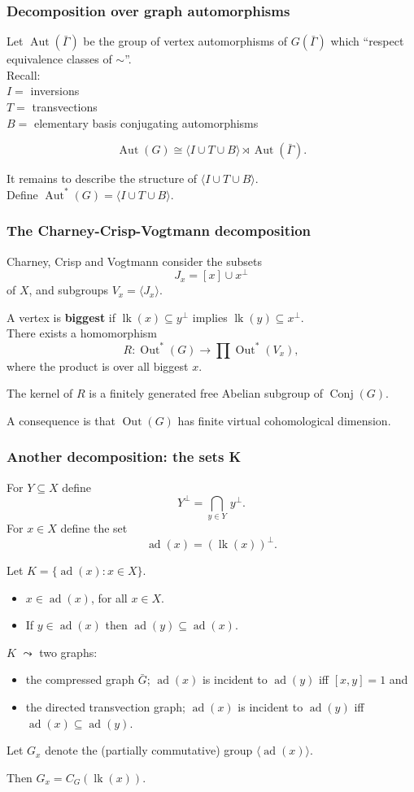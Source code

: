 \documentclass{beamer}
\newcommand{\la}{\langle}
\newcommand{\ra}{\rangle}
\def\G{\Gamma }
\newcommand{\ad}{{\operatorname{ad}}}
\newcommand{\Aut}{\operatorname{Aut}}
\newcommand{\Out}{\operatorname{Out}}
\newcommand{\maps}{\rightarrow}
\newcommand{\Conj}{\operatorname{Conj}}
\newcommand{\lk}{\operatorname{lk}}
\newcommand{\bei}{\begin{itemize}}
\newcommand{\eei}{\end{itemize}}
\begin{document}
\begin{frame}
\frametitle{Decomposition over graph automorphisms}
 Let $\Aut({\bar \G})$ be the group of vertex automorphisms
of $G(\bar \G)$ which ``respect equivalence classes of $\sim$''.\\[1em]
\pause
Recall:\\
$I=$ inversions\\
$T=$ transvections\\
$B=$ elementary basis conjugating automorphisms\\ 
\pause
\begin{theorem}
\[\Aut(G)\cong \la I\cup T\cup B\ra\rtimes \Aut(\bar \G).\] 
\end{theorem}
\pause
It remains to describe the structure of $\la I\cup T\cup B\ra$.\\[1em]
\pause
Define $\Aut^*(G)=\la I\cup T\cup B\ra$.
\end{frame}
\begin{frame}
\frametitle{The Charney-Crisp-Vogtmann decomposition}
Charney, Crisp and Vogtmann consider the subsets 
\[J_x=[x]\cup x^\perp\]
of $X$,  and subgroups $V_x=\la J_x\ra$.\\[1em]
\pause

A vertex is {\bf biggest} if $\lk(x)\subseteq y^\perp$ implies $\lk(y)\subseteq x^\perp$.\\[1em]
\pause 
There exists a homomorphism 
\[R:\Out^*(G)\maps \prod\Out^*(V_x),\]
where the product is over all biggest $x$. 

\pause
\begin{theorem}
The kernel of %
$R$ is a finitely generated free Abelian subgroup of $\Conj(G)$.
\end{theorem}
\pause
A consequence is that $\Out(G)$ has finite virtual cohomological dimension.
\end{frame}
\begin{frame}
\frametitle{Another decomposition: the sets K}
For $Y\subseteq X$ define \[Y^\perp={\displaystyle{\bigcap_{y\in Y}}}\, y^\perp.\]\pause
For $x\in X$ define the set 
\[\ad(x)=(\lk(x))^\perp.\] 
\pause

Let $K=\{\ad(x):x\in X\}$. 

\pause
\begin{itemize}
\item $x\in \ad(x)$, for all $x\in X$.
\item If $y\in \ad(x)$ then $\ad(y)\subseteq \ad(x)$. 
\end{itemize}
\pause

$K$ $\leadsto$ two graphs: \pause
\bei
\item the compressed graph $\bar G$; $\ad(x)$ is incident to $\ad(y)$ iff $[x,y]=1$ \pause and  
\item the directed transvection graph; $\ad(x)$ is incident to $\ad(y)$ iff 
$\ad(x)\subseteq \ad(y)$.
\eei
\pause

Let $G_x$ denote the (partially commutative) group $\la \ad(x)\ra$. 

Then $G_x=C_G(\lk(x))$. 
\end{frame}
\end{document}
